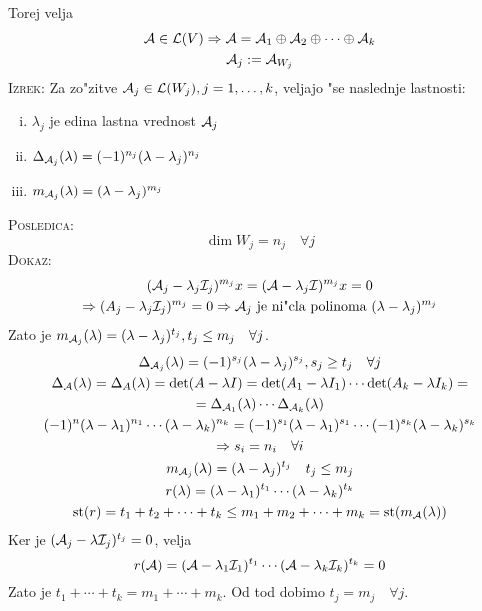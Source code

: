Torej velja
\begin{gather*}
\mathcal{A} \in \mathcal{L}(V) \Rightarrow \mathcal{A} = \mathcal{A}_1 \oplus \mathcal{A}_2 \oplus \cdots \oplus \mathcal{A}_k \\
\mathcal{A}_j := \mathcal{A}_{W_j}
\end{gather*}
\textsc{Izrek:} Za zo"zitve $\mathcal{A}_j \in \mathcal{L}(W_j), j = 1, \ldots, k$, veljajo "se naslednje lastnosti:
\begin{enumerate}[(i)]
	\item $\lambda_j$ je edina lastna vrednost $\mathcal{A}_j$
	\item $\Delta_{\mathcal{A}_j} (\lambda) = (-1)^{n_j} (\lambda - \lambda_j)^{n_j}$
	\item $m_{\mathcal{A}_j} (\lambda) = (\lambda - \lambda_j)^{m_j}$
\end{enumerate}
\textsc{Posledica:}
\begin{equation*}
\dim W_j = n_j \quad \forall j
\end{equation*}
\textsc{Dokaz:}
\begin{gather*}
(\mathcal{A}_j - \lambda_j \mathcal{I}_j)^{m_j} x = (\mathcal{A} - \lambda_j \mathcal{I})^{m_j} x = 0 \\
\Rightarrow (A_j - \lambda_j \mathcal{I}_j)^{m_j} = 0 \Rightarrow \text{$\mathcal{A}_j$ je ni"cla polinoma $(\lambda - \lambda_j)^{m_j}$}
\end{gather*}
Zato je $m_{\mathcal{A}_j}(\lambda) = (\lambda - \lambda_j)^{t_j}, t_j \leq m_j \quad \forall j$.
\begin{gather*}
\Delta_{\mathcal{A}_j}(\lambda) = (-1)^{s_j} (\lambda - \lambda_j)^{s_j}, s_j \geq t_j \quad \forall j \\
\Delta_{\mathcal{A}}(\lambda) = \Delta_A (\lambda) = \det(A - \lambda I) = \det(A_1 - \lambda I_1) \cdots \det (A_k - \lambda I_k) = \\
= \Delta_{\mathcal{A}_1}(\lambda) \cdots \Delta_{\mathcal{A}_k} (\lambda) \\
(-1)^n (\lambda - \lambda_1)^{n_1} \cdots (\lambda - \lambda_k)^{n_k} = (-1)^{s_1} (\lambda - \lambda_1)^{s_1} \cdots (-1)^{s_k} (\lambda - \lambda_k)^{s_k} \\
\Rightarrow s_i = n_i \quad \forall i \\
m_{\mathcal{A}_j} (\lambda) = (\lambda - \lambda_j)^{t_j} \quad t_j \leq m_j \\
r(\lambda) = (\lambda - \lambda_1)^{t_1} \cdots (\lambda - \lambda_k)^{t_k} \\
\operatorname{st} (r) = t_1 + t_2 + \cdots + t_k \leq m_1 + m_2 + \cdots + m_k = \operatorname{st} (m_{\mathcal{A}} (\lambda))
\end{gather*}
Ker je $(\mathcal{A}_j - \lambda \mathcal{I}_j)^{t_j} = 0$, velja 
\begin{equation*}
r(\mathcal{A}) = (\mathcal{A} - \lambda_1 \mathcal{I}_1)^{t_1}\cdots (\mathcal{A} - \lambda_k \mathcal{I}_k)^{t_k} = 0
\end{equation*}
Zato je $t_1 + \cdots + t_k = m_1 + \cdots + m_k$. Od tod dobimo $t_j = m_j \quad \forall j$.